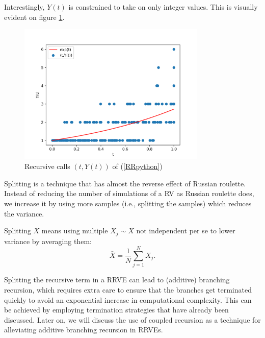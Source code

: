 \documentclass[a4paper,12pt]{article}
\begin{document}
\begin{pythonn} \label{RRpython}
    Interestingly, $Y(t)$ is constrained to take on only integer values.
    This is visually evident on figure \ref{fig:russian roulette}.
    \begin{figure}[h!]
        \centering
        \includegraphics[width=0.8\textwidth]{plots/russian roulette example.png}
        \caption{Recursive calls $(t,Y(t))$ of (\ref{RRpython}) }
        \label{fig:russian roulette}
    \end{figure}

\end{pythonn}

Splitting is a technique that has almost the reverse effect of Russian roulette.
Instead of reducing the number of simulations of a RV as Russian roulette does,
we increase it by using more samples (i.e., splitting the samples) which
reduces the variance.

\begin{definition}[splitting]
    Splitting $X$ means using multiple $X_{j} \sim X$ not independent per se to
    lower variance by averaging them:
    \[
        \bar{X}= \frac{1}{N} \sum_{j=1}^{N} X_{j}
        .\]
\end{definition}

Splitting the recursive term in a RRVE can lead to (additive) branching recursion,
which requires extra care to ensure that the branches get terminated quickly to avoid
an exponential increase in computational complexity. This can be achieved by employing
termination strategies that have already been discussed. Later on, we will discuss
the use of coupled recursion as a technique for alleviating additive branching
recursion in RRVEs.
\end{document}

